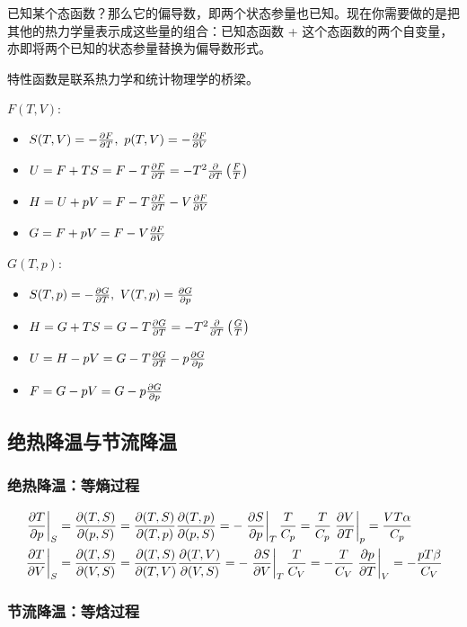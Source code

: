 已知某个态函数？那么它的偏导数，即两个状态参量也已知。现在你需要做的是把其他的热力学量表示成这些量的组合：已知态函数 + 这个态函数的两个自变量，亦即将两个已知的状态参量替换为偏导数形式。

特性函数是联系热力学和统计物理学的桥梁。

$F(T, V)$:
\begin{itemize}
    \item $S(T, V) = -\pdv{F}{T},\ p(T, V) = - \pdv{F}{V}$
    \item $U = F + T S = F - T \pdv{F}{T} = - T^2 \pdv{}{T} \left(\frac{F}{T}\right)$
    \item $H = U + p V = F - T \pdv{F}{T} - V \pdv{F}{V}$
    \item $G = F + p V = F - V \pdv{F}{V}$
\end{itemize}

$G(T, p)$:
\begin{itemize}
    \item $S(T, p) = - \pdv{G}{T},\ V(T, p) = \pdv{G}{p}$
    \item $H = G + T S = G - T \pdv{G}{T} = - T^2 \pdv{}{T} \left(\frac{G}{T}\right)$
    \item $U = H - p V = G - T \pdv{G}{T} - p \pdv{G}{p}$
    \item $F = G - p V = G - p \pdv{G}{p}$
\end{itemize}

\subsection{绝热降温与节流降温}

\subsubsection{绝热降温：等熵过程}

\begin{align*}
    \left.\pdv{T}{p}\right|_S & = \pdv{(T, S)}{(p, S)} = \pdv{(T, S)}{(T, p)} \pdv{(T, p)}{(p, S)} = -\left.\pdv{S}{p}\right|_T \frac{T}{C_p} = \frac{T}{C_p} \left.\pdv{V}{T}\right|_p = \frac{V T \alpha}{C_p}     \\
    \left.\pdv{T}{V}\right|_S & = \pdv{(T, S)}{(V, S)} = \pdv{(T, S)}{(T, V)} \pdv{(T, V)}{(V, S)} = - \left.\pdv{S}{V}\right|_T \frac{T}{C_V} = - \frac{T}{C_V} \left.\pdv{p}{T}\right|_V = - \frac{p T \beta}{C_V}
\end{align*}

\subsubsection{节流降温：等焓过程}

